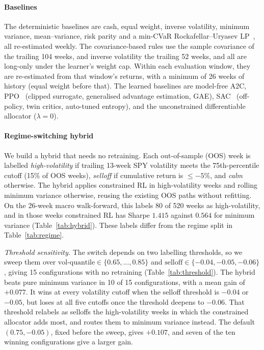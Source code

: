 \documentclass[sigconf]{acmart}
\begin{document}
\paragraph{Baselines} The deterministic baselines are cash, equal weight, inverse
volatility, minimum variance, mean--variance, risk parity and a min-CVaR
Rockafellar--Uryasev LP~\cite{rockafellar2000optimization}, all re-estimated weekly. The
covariance-based rules use the sample covariance of the trailing 104 weeks, and inverse
volatility the trailing 52 weeks, and all are long-only under the learner's weight cap. Within each
evaluation window, they are re-estimated from that window's returns, with a minimum of 26 weeks
of history (equal weight before that). The learned baselines are model-free A2C,
PPO~\cite{schulman2017ppo} (clipped surrogate, generalised advantage estimation, GAE), SAC~\cite{haarnoja2018soft}
(off-policy, twin critics, auto-tuned entropy), and the unconstrained differentiable allocator ($\lambda=0$).

\paragraph{Regime-switching hybrid}
We build a hybrid that needs no retraining. Each out-of-sample (OOS) week is labelled
\emph{high-volatility} if trailing 13-week SPY volatility meets the 75th-percentile cutoff (15\%
of OOS weeks), \emph{selloff} if cumulative return is $\le -5\%$, and \emph{calm} otherwise. The
hybrid applies constrained RL in high-volatility weeks and rolling minimum variance otherwise,
reusing the existing OOS paths without refitting. On the 26-week macro walk-forward, this labels
80 of 520 weeks as high-volatility, and in those weeks constrained RL has Sharpe $1.415$ against
$0.564$ for minimum variance (Table~\ref{tab:hybrid}). These labels differ from the regime split
in Table~\ref{tab:regime}.

\emph{Threshold sensitivity.} The switch depends on two labelling thresholds, so
we sweep them over $\text{vol-quantile}\in\{0.65,\dots,0.85\}$ and $\text{selloff}\in\{-0.04,-0.05,-0.06\}$, giving 15 configurations with no retraining (Table~\ref{tab:threshold}).
The hybrid beats pure minimum variance in 10 of 15 configurations, with a mean gain of
$+0.077$. It wins at every volatility cutoff when the selloff threshold is $-0.04$
or $-0.05$, but loses at all five cutoffs once the threshold deepens to $-0.06$. That threshold
relabels as selloffs the high-volatility weeks in which the constrained allocator adds most,
and routes them to minimum variance instead. The default $(0.75,-0.05)$, fixed before the
sweep, gives $+0.107$, and seven of the ten winning configurations give a larger gain.
\end{document}
